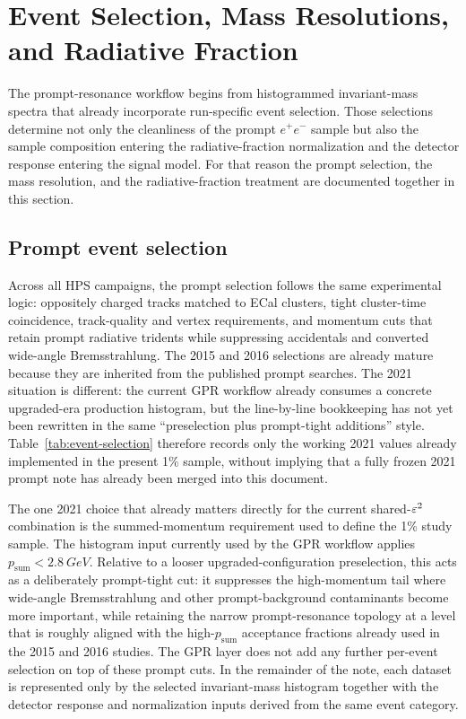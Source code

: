 \section{Event Selection, Mass Resolutions, and Radiative Fraction}
\label{sec:event-selection}

The prompt-resonance workflow begins from histogrammed invariant-mass spectra that
already incorporate run-specific event selection. Those selections determine not only
the cleanliness of the prompt $e^+e^-$ sample but also the sample composition entering
the radiative-fraction normalization and the detector response entering the signal
model. For that reason the prompt selection, the mass resolution, and the
radiative-fraction treatment are documented together in this section.

\subsection{Prompt event selection}

Across all HPS campaigns, the prompt selection follows the same experimental logic:
oppositely charged tracks matched to ECal clusters, tight cluster-time coincidence,
track-quality and vertex requirements, and momentum cuts that retain prompt radiative
tridents while suppressing accidentals and converted wide-angle Bremsstrahlung. The
2015 and 2016 selections are already mature because they are inherited from the
published prompt searches. The 2021 situation is different: the current GPR workflow
already consumes a concrete upgraded-era production histogram, but the line-by-line
bookkeeping has not yet been rewritten in the same ``preselection plus prompt-tight
additions'' style. Table~\ref{tab:event-selection} therefore records only the working
2021 values already implemented in the present 1\% sample, without implying that a
fully frozen 2021 prompt note has already been merged into this document.



The one 2021 choice that already matters directly for the current shared-$\varepsilon^2$
combination is the summed-momentum requirement used to define the 1\% study sample.
The histogram input currently used by the GPR workflow applies
$p_{\mathrm{sum}}<\SI{2.8}{GeV}$. Relative to a looser upgraded-configuration preselection, this
acts as a deliberately prompt-tight cut: it suppresses the high-momentum tail where
wide-angle Bremsstrahlung and other prompt-background contaminants become more
important, while retaining the narrow prompt-resonance topology at a level that is
roughly aligned with the high-$p_{\mathrm{sum}}$ acceptance fractions already used in
the 2015 and 2016 studies. The GPR layer does not add any further per-event selection
on top of these prompt cuts. In the remainder of the note, each dataset is represented
only by the selected invariant-mass histogram together with the detector response and
normalization inputs derived from the same event category.


